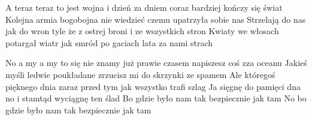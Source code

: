 \documentclass[../../../songbook.tex]{subfiles}
\begin{document}
A teraz teraz to jest wojna i dzień za dniem coraz bardziej kończy się świat \newline
Kolejna armia bogobojna nie wiedzieć czemu upatrzyła sobie nas \newline
Strzelają do nas jak do wron tyle że z ostrej broni i ze wszystkich stron \newline
Kwiaty we włosach potargał wiatr jak smród po gaciach lata za nami strach \newline

No a my a my to się nie znamy już prawie czasem napiszesz coś zza oceanu \newline
Jakieś myśli ledwie poukładane zrzucisz mi do skrzynki ze spamem \newline
Ale któregoś pięknego dnia zaraz przed tym jak wszystko trafi szlag \newline
Ja sięgnę do pamięci dna no i stamtąd wyciągnę ten ślad \newline
Bo gdzie było nam tak bezpiecznie jak tam \newline
No bo gdzie było nam tak bezpiecznie jak tam \newline
\end{document}
